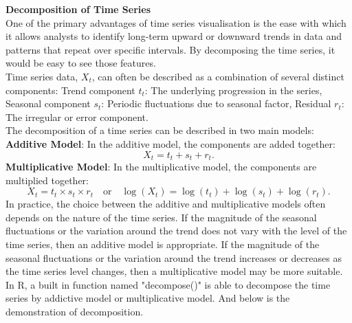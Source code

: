 \documentclass{article}\usepackage[]{graphicx}\usepackage[]{xcolor}
\begin{document}
\noindent
\textbf{Decomposition of Time Series}\\

\noindent
One of the primary advantages of time series visualisation is the ease with which it allows analysts to identify long-term upward or downward trends in data and patterns that repeat over specific intervals. By decomposing the time series, it would be easy to see those features.\\

\noindent
Time series data, $X_t$, can often be described as a combination of several distinct components: Trend component $t_t$: The underlying progression in the series, Seasonal component $s_t$: Periodic fluctuations due to seasonal factor, Residual $r_t$: The irregular or error component.\\

\noindent
The decomposition of a time series can be described in two main models:\\
\textbf{Additive Model}: In the additive model, the components are added together:
\[
X_t = t_t + s_t + r_t.
\]
\textbf{Multiplicative Model}: In the multiplicative model, the components are multiplied together:
\[
X_t = t_t \times s_t \times r_t \quad \text{or} \quad \log(X_t) = \log(t_t) + \log(s_t) + \log(r_t).
\]
In practice, the choice between the additive and multiplicative models often depends on the nature of the time series. If the magnitude of the seasonal fluctuations or the variation around the trend does not vary with the level of the time series, then an additive model is appropriate. If the magnitude of the seasonal fluctuations or the variation around the trend increases or decreases as the time series level changes, then a multiplicative model may be more suitable.\\

\noindent
In R, a built in function named "decompose()" is able to decompose the time series by addictive model or multiplicative model. And below is the demonstration of decomposition.
\end{document}

